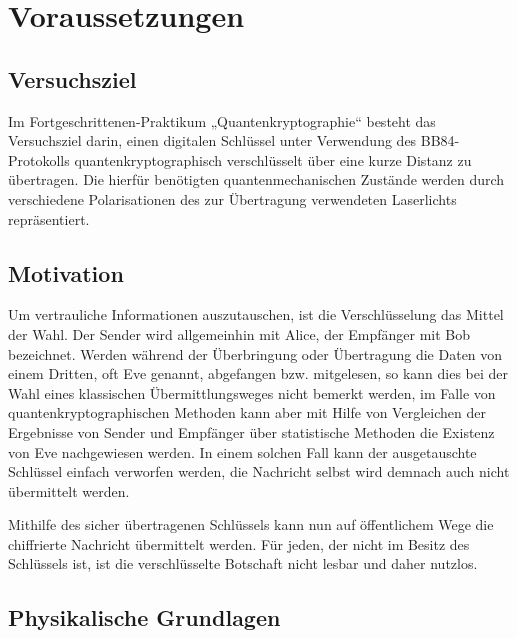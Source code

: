 \section{Voraussetzungen}

\subsection{Versuchsziel}

Im Fortgeschrittenen-Praktikum „Quantenkryptographie“ besteht das Versuchsziel
darin, einen digitalen Schlüssel unter Verwendung des BB84-Protokolls
quantenkryptographisch verschlüsselt über eine kurze Distanz zu übertragen.
Die hierfür benötigten quantenmechanischen Zustände werden durch verschiedene
Polarisationen des zur Übertragung verwendeten Laserlichts repräsentiert.

\subsection{Motivation}

Um vertrauliche Informationen auszutauschen, ist die Verschlüsselung das
Mittel der Wahl. Der Sender wird allgemeinhin mit Alice, der Empfänger mit Bob
bezeichnet. Werden während der Überbringung oder Übertragung die Daten von
einem Dritten, oft Eve genannt, abgefangen bzw. mitgelesen, so kann dies bei
der Wahl eines klassischen Übermittlungsweges nicht bemerkt werden, im Falle
von quantenkryptographischen Methoden kann aber mit Hilfe von Vergleichen der
Ergebnisse von Sender und Empfänger über statistische Methoden die Existenz
von Eve nachgewiesen werden. In einem solchen Fall kann der ausgetauschte
Schlüssel einfach verworfen werden, die Nachricht selbst wird demnach auch
nicht übermittelt werden.

Mithilfe des sicher übertragenen Schlüssels kann nun auf öffentlichem Wege die
chiffrierte Nachricht übermittelt werden. Für jeden, der nicht im Besitz des
Schlüssels ist, ist die verschlüsselte Botschaft nicht lesbar und daher nutzlos.


\subsection{Physikalische Grundlagen}

